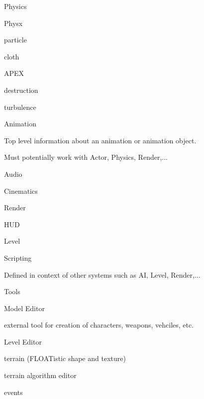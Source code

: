 \begin{DoxyItemize}
\item Physics
\begin{DoxyItemize}
\item Physx
\begin{DoxyItemize}
\item particle
\item cloth
\end{DoxyItemize}
\item APEX
\begin{DoxyItemize}
\item destruction
\item turbulence
\end{DoxyItemize}
\end{DoxyItemize}
\item Animation
\begin{DoxyItemize}
\item Top level information about an animation or animation object.
\item Must potentially work with Actor, Physics, Render,...
\end{DoxyItemize}
\item Audio
\item Cinematics
\item Render
\begin{DoxyItemize}
\item HUD
\end{DoxyItemize}
\item Level
\item Scripting
\begin{DoxyItemize}
\item Defined in context of other systems such as AI, Level, Render,...
\end{DoxyItemize}
\item Tools
\begin{DoxyItemize}
\item Model Editor
\begin{DoxyItemize}
\item external tool for creation of characters, weapons, vehciles, etc.
\end{DoxyItemize}
\item Level Editor
\begin{DoxyItemize}
\item terrain (FLOATistic shape and texture)
\item terrain algorithm editor
\item events
\end{DoxyItemize}

\end{DoxyItemize}
\end{DoxyItemize}
